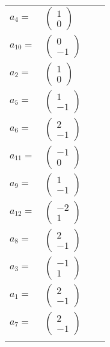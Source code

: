 \documentclass[1p]{elsarticle_modified}
\theoremstyle{definition}
\begin{document}
\begin{tabular}{m{7pt} m{180pt} m{7pt} m{180pt} }
\flushright $a_{4}=$&$\begin{pmatrix}1\\0\end{pmatrix}$ \\
\flushright $a_{10}=$&$\begin{pmatrix}0\\-1\end{pmatrix}$ \\
\flushright $a_{2}=$&$\begin{pmatrix}1\\0\end{pmatrix}$ \\
\flushright $a_{5}=$&$\begin{pmatrix}1\\-1\end{pmatrix}$ \\
\flushright $a_{6}=$&$\begin{pmatrix}2\\-1\end{pmatrix}$ \\
\flushright $a_{11}=$&$\begin{pmatrix}-1\\0\end{pmatrix}$ \\
\flushright $a_{9}=$&$\begin{pmatrix}1\\-1\end{pmatrix}$ \\
\flushright $a_{12}=$&$\begin{pmatrix}-2\\1\end{pmatrix}$ \\
\flushright $a_{8}=$&$\begin{pmatrix}2\\-1\end{pmatrix}$ \\
\flushright $a_{3}=$&$\begin{pmatrix}-1\\1\end{pmatrix}$ \\
\flushright $a_{1}=$&$\begin{pmatrix}2\\-1\end{pmatrix}$ \\
\flushright $a_{7}=$&$\begin{pmatrix}2\\-1\end{pmatrix}$\\&\end{tabular}
\end{document}
